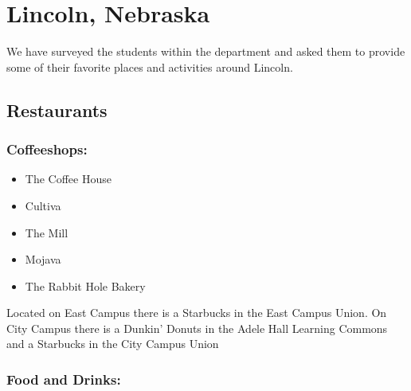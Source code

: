 \documentclass[
  12pt,
]{book}
\providecommand{\tightlist}{%
  \setlength{\itemsep}{0pt}\setlength{\parskip}{0pt}}
\begin{document}
\hypertarget{lincoln-NE}{%
\chapter{Lincoln, Nebraska}\label{lincoln-NE}}

We have surveyed the students within the department and asked them to provide some of their favorite places and activities around Lincoln.

\hypertarget{restaurants}{%
\section{Restaurants}\label{restaurants}}

\hypertarget{coffeeshops}{%
\subsection{Coffeeshops:}\label{coffeeshops}}

\begin{itemize}
\tightlist
\item
  The Coffee House
\item
  Cultiva
\item
  The Mill
\item
  Mojava
\item
  The Rabbit Hole Bakery
\end{itemize}

Located on East Campus there is a Starbucks in the East Campus Union. On City Campus there is a Dunkin' Donuts in the Adele Hall Learning Commons and a Starbucks in the City Campus Union

\hypertarget{food-and-drinks}{%
\subsection{Food and Drinks:}\label{food-and-drinks}}
\end{document}
